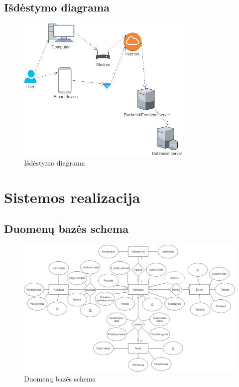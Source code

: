 \documentclass[oneside]{VUMIFPSkursinis}
\begin{document}
	\subsection{Išdėstymo diagrama}
			\begin{figure}[h]
    				\centering
    				\includegraphics[width=0.75\textwidth]{Deployment.png}
    				\caption{Išdėstymo diagrama}
			\end{figure}

\section{Sistemos realizacija}
	\subsection{Duomenų bazės schema}
	\begin{figure}[h]
    				\centering
    				\includegraphics[width=1\textwidth]{Database2.png}
    				\caption{Duomenų bazės schema}
			\end{figure}
\end{document}
